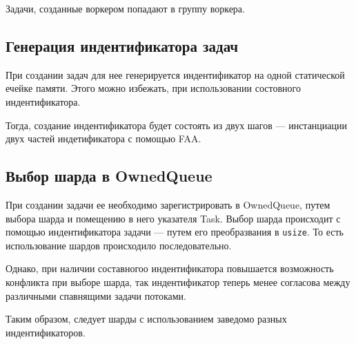 Задачи, созданные воркером попадают в группу воркера.

\subsection{Генерация индентификатора задач}

При создании задач для нее генерируется индентификатор на одной статической ечейке памяти. Этого можно избежать, при использовании состовного индентификатора.

Тогда, создание индентификатора будет состоять из двух шагов --- инстанциации двух частей индетификатора с помощью FAA.

\subsection{Выбор шарда в OwnedQueue}

При создании задачи ее необходимо зарегистрировать в OwnedQueue, путем выбора шарда и помещению в него указателя Task. Выбор шарда происходит с помощью индентификатора задачи --- путем его преобразвания в \verb|usize|. То есть использование шардов происходило последовательно.

Однако, при наличии составногоо индентификатора повышается возможность конфликта при выборе шарда, так индентификатор теперь менее согласова между различными спавнящими задачи потоками.

Таким образом, следует шарды с использованием заведомо разных индентификаторов.
